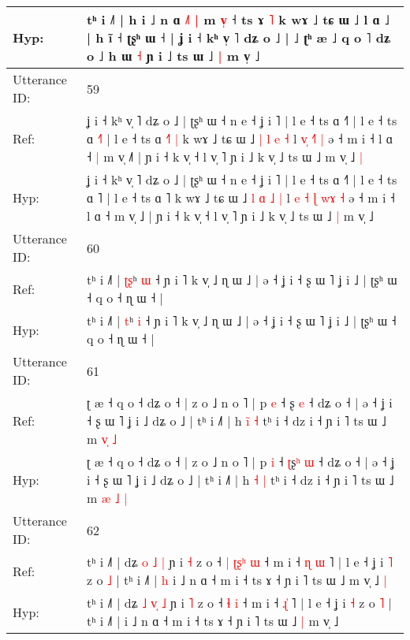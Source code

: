 \documentclass[10pt]{article}
\DeclareRobustCommand{\hl}[1]{{\textcolor{red}{#1}}}
\begin{document}
\begin{longtable}{ll}
 \\
Hyp: & tʰ i ˩˥ | h i ˩ n ɑ\hl{ }\hl{˩}\hl{˥} \hl{|} m \hl{v}\hl{̩} ˧ ts ɤ \hl{˥} k wɤ ˩ tɕ ɯ ˩ l ɑ ˩ | h ĩ ˧ ʈʂʰ ɯ ˧ | ʝ i ˧ kʰ v̩ ˥ dʑ o ˩ |\hl{}\hl{}\hl{}\hl{}\hl{} ˩ ʈʰ æ ˩ q o ˥ dʑ o ˩ h ɯ \hl{˧} ɲ i\hl{}\hl{}\hl{}\hl{}\hl{}\hl{} ˩ ts ɯ ˩\hl{ }\hl{|} m v̩ ˩\hl{}\hl{}
 \\
\midrule
Utterance ID: & 59 \\
Ref: & ʝ i ˧ kʰ v̩ ˥ dʑ o ˩ | ʈʂʰ ɯ ˧ n e ˧ ʝ i ˥ | l e ˧ ts ɑ ˧˥ | l e ˧ ts ɑ \hl{˧}˥ | l e ˧ ts ɑ \hl{˧}˥\hl{ }\hl{|} k wɤ ˩ tɕ ɯ ˩ \hl{|} \hl{l} \hl{e} \hl{˧} l\hl{}\hl{} \hl{}\hl{v}\hl{̩} \hl{˧}\hl{˥} \hl{|} ə ˧ m i ˧ l ɑ ˧\hl{ }\hl{|} m v̩ ˩\hl{˥} | ɲ i ˧ k v̩ ˧ l v̩ ˥ ɲ i ˩ k v̩ ˩ ts ɯ ˩\hl{}\hl{} m v̩ ˩\hl{ }\hl{|}
 \\
Hyp: & ʝ i ˧ kʰ v̩ ˥ dʑ o ˩ | ʈʂʰ ɯ ˧ n e ˧ ʝ i ˥ | l e ˧ ts ɑ ˧˥ | l e ˧ ts ɑ \hl{}˥ | l e ˧ ts ɑ \hl{}˥\hl{}\hl{} k wɤ ˩ tɕ ɯ ˩ \hl{l} \hl{ɑ} \hl{˩} \hl{|} l\hl{ }\hl{e} \hl{˧}\hl{ }\hl{ɭ} \hl{w}\hl{ɤ} \hl{˧} ə ˧ m i ˧ l ɑ ˧\hl{}\hl{} m v̩ ˩\hl{} | ɲ i ˧ k v̩ ˧ l v̩ ˥ ɲ i ˩ k v̩ ˩ ts ɯ ˩\hl{ }\hl{|} m v̩ ˩\hl{}\hl{}
 \\
\midrule
Utterance ID: & 60 \\
Ref: & tʰ i ˩˥ | \hl{ʈ}\hl{ʂ}ʰ \hl{ɯ} ˧ ɲ i ˥ k v̩ ˩ ɳ ɯ ˩ | ə ˧ ʝ i ˧ ʂ ɯ ˥ ʝ i ˩ | ʈʂʰ ɯ ˧ q o ˧ ɳ ɯ ˧ |
 \\
Hyp: & tʰ i ˩˥ | \hl{}\hl{t}ʰ \hl{i} ˧ ɲ i ˥ k v̩ ˩ ɳ ɯ ˩ | ə ˧ ʝ i ˧ ʂ ɯ ˥ ʝ i ˩ | ʈʂʰ ɯ ˧ q o ˧ ɳ ɯ ˧ |
 \\
\midrule
Utterance ID: & 61 \\
Ref: & ʈ æ ˧ q o ˧ dʑ o ˧ | z o ˩ n o ˥ | p \hl{e} ˧ \hl{}ʂ\hl{} \hl{e} ˧ dʑ o ˧ | ə ˧ ʝ i ˧ ʂ ɯ ˥ ʝ i ˩ dʑ o ˩ | tʰ i ˩˥ | h \hl{i}\hl{̃} \hl{˧} tʰ i ˧ dz i ˧ ɲ i ˥ ts ɯ ˩ m \hl{}\hl{v}\hl{̩} \hl{˩}
 \\
Hyp: & ʈ æ ˧ q o ˧ dʑ o ˧ | z o ˩ n o ˥ | p \hl{i} ˧ \hl{ʈ}ʂ\hl{ʰ} \hl{ɯ} ˧ dʑ o ˧ | ə ˧ ʝ i ˧ ʂ ɯ ˥ ʝ i ˩ dʑ o ˩ | tʰ i ˩˥ | h \hl{}\hl{˧} \hl{|} tʰ i ˧ dz i ˧ ɲ i ˥ ts ɯ ˩ m \hl{æ}\hl{ }\hl{˩} \hl{|}
 \\
\midrule
Utterance ID: & 62 \\
Ref: & tʰ i ˩˥ | dʑ \hl{o} \hl{}\hl{˩} \hl{|} ɲ i \hl{˧} z o ˧\hl{ }\hl{|} \hl{ʈ}\hl{ʂ}\hl{ʰ} \hl{ɯ} ˧ m i ˧ \hl{ɳ}\hl{ }\hl{ɯ} ˥ | l e ˧ ʝ i \hl{˥} z o \hl{˩} | tʰ i ˩˥ |\hl{ }\hl{h} i ˩ n ɑ ˧ m i ˧ ts ɤ ˧ ɲ i ˥ ts ɯ ˩\hl{}\hl{} m v̩ ˩\hl{ }\hl{|}
 \\
Hyp: & tʰ i ˩˥ | dʑ \hl{˩} \hl{v}\hl{̩} \hl{˩} ɲ i \hl{˥} z o ˧\hl{}\hl{} \hl{}\hl{}\hl{ɬ} \hl{i} ˧ m i ˧ \hl{}\hl{ɻ}\hl{̍} ˥ | l e ˧ ʝ i \hl{˧} z o \hl{˥} | tʰ i ˩˥ |\hl{}\hl{} i ˩ n ɑ ˧ m i ˧ ts ɤ ˧ ɲ i ˥ ts ɯ ˩\hl{ }\hl{|} m v̩ ˩\hl{}\hl{}

\end{longtable}
\end{document}
